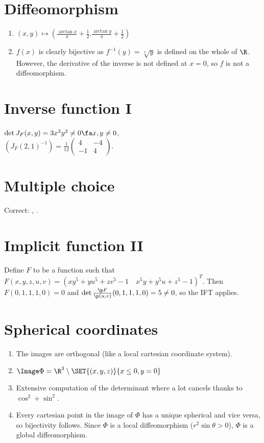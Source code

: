 \documentclass{article}
\begin{document}

\section{Diffeomorphism}
\begin{enumerate}
    \item $(x, y) \mapsto \left(\frac{\arctan x}{\pi} + \frac12. \frac{\arctan y}{\pi} + \frac12\right)$
    \item $f(x)$ is clearly bijective as $f^{-1}(y) =\sqrt[5]{y}$ is defined on the whole of $\R$. However, the derivative of the inverse is not defined at $x = 0$, so $f$ is not a diffeomorphism.

\end{enumerate}

\section{Inverse function I}
$\det J_F(x, y) = 3x^2 y^2 \neq 0 \fa x, y \neq 0$, \\
$(J_F(2, 1)^{-1}) = \frac{1}{12}\begin{pmatrix}
    4 & -4 \\ -1 & 4
\end{pmatrix}$.

\addtocounter{section}{1}

\section{Multiple choice}
Correct: , .

\section{Implicit function II}
Define $F$ to be a function such that $F(x, y, z, u, v) = \left(xy^5 + yu^5 + zv^5 - 1 \quad x^5y + y^5u + z^5 - 1\right)^T$. Then $F(0, 1, 1, 1, 0) = 0$ and $\det \frac{\p F}{\p (u, v)}(0, 1, 1, 1, 0) = 5 \neq 0$, so the IFT applies.

\section{Spherical coordinates}
\begin{enumerate}
    \item The images are orthogonal (like a local cartesian coordinate system).
    \item $\Image \Phi = \R^3 \setminus \SET{(x, y, z)}{x \leq 0, y = 0}$
    \item Extensive computation of the determinant where a lot cancels thanks to $\cos^2 + \sin^2$.
    \item Every cartesian point in the image of $\Phi$ has a unique spherical and vice versa, so bijectivity follows. Since $\Phi$ is a local diffeomorphism ($r^2 \sin \theta > 0$), $\Phi$ is a global diffeomorphism. 
\end{enumerate}
\end{document}
